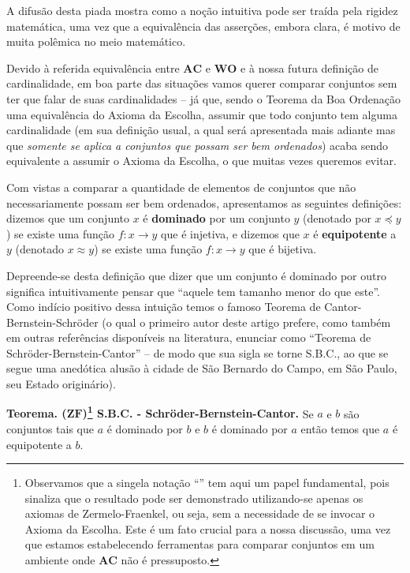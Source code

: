 \documentclass{hipatia}
\newcommand{\no}{\noindent}
\newcommand{\wo}{\mathbf{WO}}
\newcommand{\ac}{\mathbf{AC}}
\newcommand{\zf}{\mathbf{ZF}}
\begin{document}
A difusão desta piada mostra como a noção intuitiva pode ser
traída pela rigidez matemática, uma vez que a equivalência
das asserções, embora clara, é motivo de muita polêmica no
meio matemático. 

\sepdecorada

Devido à referida equivalência entre $\ac$ e $\wo$ e à nossa futura definição de
cardinalidade, em boa parte das situações vamos querer comparar conjuntos
sem ter que falar de suas cardinalidades -- já que, sendo o
Teorema da Boa Ordenação uma equivalência do Axioma da
Escolha, assumir que todo conjunto tem alguma cardinalidade
(em sua definição 
usual, a qual será apresentada mais adiante mas que {\it somente se aplica a conjuntos que possam ser bem ordenados}) 
acaba sendo equivalente a assumir o Axioma da Escolha, o
que muitas vezes queremos evitar.

Com vistas a comparar a quantidade de elementos de conjuntos
que não necessariamente possam ser bem ordenados,
apresentamos as seguintes definições: dizemos que um
conjunto $x$ é {\bf dominado} por um conjunto $y$ (denotado
por $x \preccurlyeq y$) se existe uma função $f\colon
x\rightarrow y$ que é injetiva, e dizemos que $x$ é {\bf
equipotente} a $y$ (denotado $x \approx y$) se existe uma
função $f\colon x\rightarrow y$ que é bijetiva.

Depreende-se desta definição que dizer que um conjunto é
dominado por outro significa intuitivamente pensar que
``aquele tem tamanho menor do que este''. Como indício
positivo dessa intuição temos o famoso Teorema de
Cantor-Bernstein-Schröder (o qual o primeiro autor deste
artigo prefere, como também em outras referências
disponíveis na literatura, enunciar como ``Teorema de
Schröder-Bernstein-Cantor'' --  de modo que sua sigla se
torne S.B.C., ao que se segue uma anedótica alusão à cidade
de São Bernardo do Campo, em São Paulo, seu Estado
originário).


\no\textbf{Teorema. ($\zf$)\footnote{Observamos que a singela notação ``\text{($\zf$)}'' tem aqui um papel fundamental, pois sinaliza que o resultado pode ser demonstrado utilizando-se apenas os axiomas de Zermelo-Fraenkel, ou seja, sem a necessidade de se invocar o Axioma da Escolha. Este é um fato crucial para a nossa discussão, uma vez que estamos estabelecendo ferramentas para comparar conjuntos em um ambiente onde $\ac$ não é pressuposto.} S.B.C. - Schröder-Bernstein-Cantor.} Se $a$ e $b$ são conjuntos tais
que $a$ é dominado por $b$ e $b$ é dominado por $a$ então
temos que $a$ é equipotente a $b$.
\end{document}
